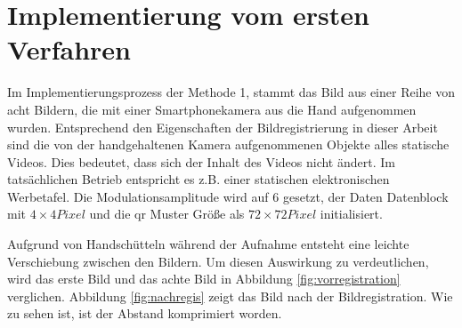 \section{Implementierung vom ersten Verfahren}
Im Implementierungsprozess der Methode 1, stammt das Bild aus einer Reihe von acht Bildern, die mit einer Smartphonekamera aus die Hand aufgenommen wurden. Entsprechend den Eigenschaften der Bildregistrierung in dieser Arbeit sind die von der handgehaltenen Kamera aufgenommenen Objekte alles statische Videos. Dies bedeutet, dass sich der Inhalt des Videos nicht ändert. Im tatsächlichen Betrieb entspricht es z.B. einer statischen elektronischen Werbetafel. Die Modulationsamplitude wird auf 6 gesetzt, der Daten Datenblock mit $ 4 \times 4 Pixel$ und die \gls{qr} Muster Größe als $ 72 \times 72 Pixel$ initialisiert.

Aufgrund von Handschütteln während der Aufnahme entsteht eine leichte Verschiebung zwischen den Bildern. Um diesen Auswirkung zu verdeutlichen, wird das erste Bild und das achte Bild in Abbildung \ref{fig:vorregistration} verglichen. 
Abbildung \ref{fig:nachregis} zeigt das Bild nach der Bildregistration. Wie zu sehen ist, ist der Abstand komprimiert worden. %
 

